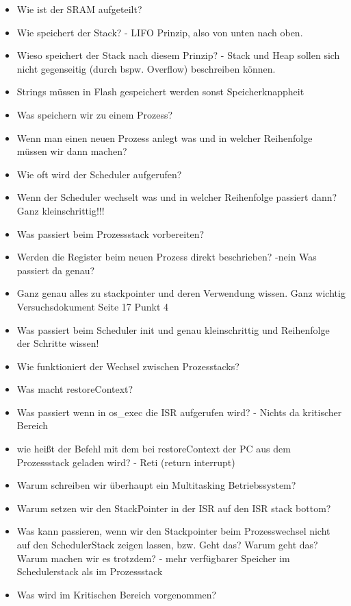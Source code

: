 \documentclass[12pt]{article}
\begin{document}
\begin{itemize}
\item Wie ist der SRAM aufgeteilt?
\item Wie speichert der Stack? - LIFO Prinzip, also von unten nach oben.
\item Wieso speichert der Stack nach diesem Prinzip? - Stack und Heap sollen sich nicht gegenseitig (durch bspw. Overflow) beschreiben können.
\item Strings müssen in Flash gespeichert werden sonst Speicherknappheit
\item Was speichern wir zu einem Prozess?
\item Wenn man einen neuen Prozess anlegt was und in welcher Reihenfolge müssen wir dann machen?
\item Wie oft wird der Scheduler aufgerufen?
\item Wenn der Scheduler wechselt was und in welcher Reihenfolge passiert dann? Ganz kleinschrittig!!!
\item Was passiert beim Prozessstack vorbereiten?
\item Werden die Register beim neuen Prozess direkt beschrieben? -nein Was passiert da genau?
\item Ganz genau alles zu stackpointer und deren Verwendung wissen. Ganz wichtig Versuchsdokument Seite 17 Punkt 4
\item Was passiert beim Scheduler init und genau kleinschrittig und Reihenfolge der Schritte wissen!
\item Wie funktioniert der Wechsel zwischen Prozesstacks?
\item Was macht restoreContext?
\item Was passiert wenn in os\_exec die ISR aufgerufen wird? - Nichts da kritischer Bereich
\item wie heißt der Befehl mit dem bei restoreContext der PC aus dem Prozessstack geladen wird? - Reti (return interrupt)
\item Warum schreiben wir überhaupt ein Multitasking Betriebssystem?
\item Warum setzen wir den StackPointer in der ISR auf den ISR stack bottom?
\item Was kann passieren, wenn wir den Stackpointer beim Prozesswechsel nicht auf den SchedulerStack zeigen lassen, bzw. Geht das? Warum geht das? Warum machen wir es trotzdem? - mehr verfügbarer Speicher im Schedulerstack als im Prozessstack
\item Was wird im Kritischen Bereich vorgenommen?
\end{itemize}
\end{document}
